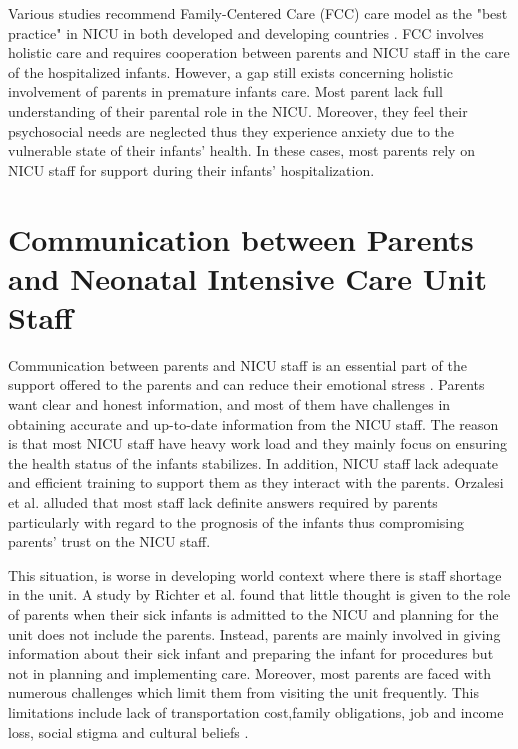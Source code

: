 Various studies recommend Family-Centered Care (FCC) care model as the "best practice" in NICU in both developed and developing countries \textcite{Al-Motlaq2017, Rostami2015}. FCC involves holistic care and requires cooperation between parents and NICU staff in the care of the hospitalized infants. However, a gap still exists concerning holistic involvement of parents in premature infants care. Most parent lack full understanding of their parental role in the NICU. Moreover, they feel their psychosocial needs are neglected thus they experience anxiety due to the vulnerable state of their infants' health. In these cases, most parents rely on NICU staff for support during their infants' hospitalization.

\section{Communication between Parents and Neonatal Intensive Care Unit Staff}
Communication between parents and NICU staff is an essential part of the support offered to the parents and can reduce their emotional stress \textcite{Turner2015, Jones2015, Orzalesi2011, Kowalski2006}. Parents want clear and honest information, and most of them have challenges in obtaining accurate and up-to-date information from the NICU staff. The reason is that most NICU staff have heavy work load and they mainly focus on ensuring the health status of the infants stabilizes. In addition, NICU staff lack adequate and efficient training to support them as they interact with the parents. Orzalesi et al. \textcite{Orzalesi2011} alluded that most staff lack definite answers required by parents particularly with regard to the prognosis of the infants thus compromising parents' trust on the NICU staff.

This situation, is worse in developing world context where there is staff shortage in the unit. A study by Richter et al. \textcite{Ritcher2009} found that little thought is given to the role of parents when their sick infants is admitted to the NICU and planning for the unit does not include the parents. Instead, parents are mainly involved in giving information about their sick infant and preparing the infant for procedures but not in planning and implementing care. Moreover, most parents are faced with numerous challenges which limit them from visiting the unit frequently. This limitations include lack of transportation cost,family obligations, job and income loss, social stigma and cultural beliefs \textcite{Martinez2012, Thompson1993, Heidari2012}.

